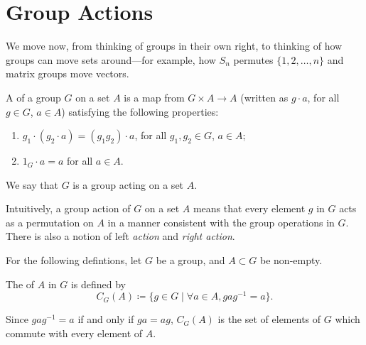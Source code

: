 \begin{theorem}

\end{theorem}

\begin{theorem}

\end{theorem}
\pagebreak

\section{Group Actions}
We move now, from thinking of groups in their own right, to thinking of how groups can move sets around---for example, how $S_n$ permutes $\{1,2,\dots,n\}$ and matrix groups move vectors.

\begin{definition}
A  of a group $G$ on a set $A$ is a map from $G\times A\to A$ (written as $g\cdot a$, for all $g\in G$, $a\in A$) satisfying the following properties:
\begin{enumerate}[label=(\roman*)]
\item $g_1\cdot(g_2\cdot a)=(g_1g_2)\cdot a$, for all $g_1,g_2\in G$, $a\in A$;
\item $1_G\cdot a=a$ for all $a\in A$.
\end{enumerate}
We say that $G$ is a group acting on a set $A$.
\end{definition}

Intuitively, a group action of $G$ on a set $A$ means that every element $g$ in $G$ acts as a permutation on $A$ in a manner consistent with the group operations in $G$. There is also a notion of left \emph{action} and \emph{right action}.

For the following defintions, let $G$ be a group, and $A\subset G$ be non-empty.

\begin{definition}[Centraliser]
The  of $A$ in $G$ is defined by
\[C_G(A)\coloneqq\{g\in G\mid\forall a\in A,gag^{-1}=a\}.\]
\end{definition}

Since $gag^{-1}=a$ if and only if $ga=ag$, $C_G(A)$ is the set of elements of $G$ which commute with every element of $A$.

